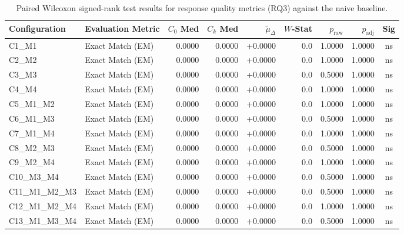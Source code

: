 \begin{table}[p]
\centering
\scriptsize
\setlength{\tabcolsep}{2.4pt}
\renewcommand{\arraystretch}{0.92}
\caption{Paired Wilcoxon signed-rank test results for response quality metrics (RQ3) against the naive baseline.}
\label{tab:wilcoxon_rq3}
\begin{tabular*}{\textwidth}{@{\extracolsep{\fill}} l l r r r r r r c @{}}
\toprule
\textbf{Configuration} & \textbf{Evaluation Metric} & \textbf{$C_0$ Med} & \textbf{$C_k$ Med} & \textbf{$\tilde{\mu}_\Delta$} & \textbf{$W$-Stat} & \textbf{$p_{\text{raw}}$} & \textbf{$p_{\text{adj}}$} & \textbf{Sig} \\
\midrule
C1\_M1          & Exact Match (EM)     & 0.0000 & 0.0000 & +0.0000 & 0.0 & 1.0000 & 1.0000 & ns \\
\addlinespace
C2\_M2          & Exact Match (EM)     & 0.0000 & 0.0000 & +0.0000 & 0.0 & 1.0000 & 1.0000 & ns \\
\addlinespace
C3\_M3          & Exact Match (EM)     & 0.0000 & 0.0000 & +0.0000 & 0.0 & 0.5000 & 1.0000 & ns \\
\addlinespace
C4\_M4          & Exact Match (EM)     & 0.0000 & 0.0000 & +0.0000 & 0.0 & 1.0000 & 1.0000 & ns \\
\addlinespace
C5\_M1\_M2      & Exact Match (EM)     & 0.0000 & 0.0000 & +0.0000 & 0.0 & 1.0000 & 1.0000 & ns \\
\addlinespace
C6\_M1\_M3      & Exact Match (EM)     & 0.0000 & 0.0000 & +0.0000 & 0.0 & 0.5000 & 1.0000 & ns \\
\addlinespace
C7\_M1\_M4      & Exact Match (EM)     & 0.0000 & 0.0000 & +0.0000 & 0.0 & 1.0000 & 1.0000 & ns \\
\addlinespace
C8\_M2\_M3      & Exact Match (EM)     & 0.0000 & 0.0000 & +0.0000 & 0.0 & 0.5000 & 1.0000 & ns \\
\addlinespace
C9\_M2\_M4      & Exact Match (EM)     & 0.0000 & 0.0000 & +0.0000 & 0.0 & 1.0000 & 1.0000 & ns \\
\addlinespace
C10\_M3\_M4     & Exact Match (EM)     & 0.0000 & 0.0000 & +0.0000 & 0.0 & 0.5000 & 1.0000 & ns \\
\addlinespace
C11\_M1\_M2\_M3 & Exact Match (EM)     & 0.0000 & 0.0000 & +0.0000 & 0.0 & 0.5000 & 1.0000 & ns \\
\addlinespace
C12\_M1\_M2\_M4 & Exact Match (EM)     & 0.0000 & 0.0000 & +0.0000 & 0.0 & 1.0000 & 1.0000 & ns \\
\addlinespace
C13\_M1\_M3\_M4 & Exact Match (EM)     & 0.0000 & 0.0000 & +0.0000 & 0.0 & 0.5000 & 1.0000 & ns \\

\end{tabular*}
\end{table}
